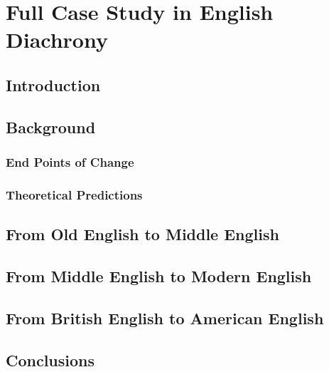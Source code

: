 \chapter{Full Case Study in English Diachrony}
\section{Introduction}
\section{Background}
\subsection{End Points of Change}
\subsection{Theoretical Predictions}
\section{From Old English to Middle English}
\section{From Middle English to Modern English}
\section{From British English to American English}
\section{Conclusions}

